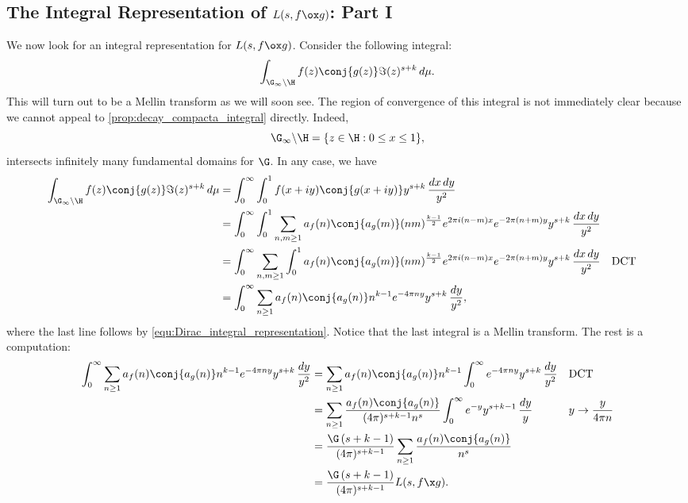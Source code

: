     \subsection*{The Integral Representation of \texorpdfstring{$L(s,f \ox g)$}{L(s,f \ox g)}: Part I}
      We now look for an integral representation for $L(s,f \ox g)$. Consider the following integral:
      \[
        \int_{\G_{\infty}\backslash\H}f(z)\conj{g(z)}\Im(z)^{s+k}\,d\mu.
      \]
      This will turn out to be a Mellin transform as we will soon see. The region of convergence of this integral is not immediately clear because we cannot appeal to \cref{prop:decay_compacta_integral} directly. Indeed,
      \[
        \G_{\infty}\backslash\H = \{z \in \H:0 \le x \le 1\},
      \]
      intersects infinitely many fundamental domains for $\G$. In any case, we have
      \begin{align*}
        \int_{\G_{\infty}\backslash\H}f(z)\conj{g(z)}\Im(z)^{s+k}\,d\mu &= \int_{0}^{\infty}\int_{0}^{1}f(x+iy)\conj{g(x+iy)}y^{s+k}\,\frac{dx\,dy}{y^{2}} \\
        &= \int_{0}^{\infty}\int_{0}^{1}\sum_{n,m \ge 1}a_{f}(n)\conj{a_{g}(m)}(nm)^{\frac{k-1}{2}}e^{2\pi i(n-m)x}e^{-2\pi(n+m)y}y^{s+k}\,\frac{dx\,dy}{y^{2}} \\
        &= \int_{0}^{\infty}\sum_{n,m \ge 1}\int_{0}^{1}a_{f}(n)\conj{a_{g}(m)}(nm)^{\frac{k-1}{2}}e^{2\pi i(n-m)x}e^{-2\pi(n+m)y}y^{s+k}\,\frac{dx\,dy}{y^{2}} && \text{DCT} \\
        &= \int_{0}^{\infty}\sum_{n \ge 1}a_{f}(n)\conj{a_{g}(n)}n^{k-1}e^{-4\pi ny}y^{s+k}\,\frac{dy}{y^{2}},
      \end{align*}
      where the last line follows by \cref{equ:Dirac_integral_representation}. Notice that the last integral is a Mellin transform. The rest is a computation:
      \begin{align*}
        \int_{0}^{\infty}\sum_{n \ge 1}a_{f}(n)\conj{a_{g}(n)}n^{k-1}e^{-4\pi ny}y^{s+k}\,\frac{dy}{y^{2}} &= \sum_{n \ge 1}a_{f}(n)\conj{a_{g}(n)}n^{k-1}\int_{0}^{\infty}e^{-4\pi ny}y^{s+k}\,\frac{dy}{y^{2}} &&\text{DCT} \\
        &= \sum_{n \ge 1}\frac{a_{f}(n)\conj{a_{g}(n)}}{(4\pi)^{s+k-1}n^{s}}\int_{0}^{\infty}e^{-y}y^{s+k-1}\,\frac{dy}{y} &&\text{$y \to \frac{y}{4\pi n}$} \\
        &= \frac{\G\left(s+k-1\right)}{(4\pi)^{s+k-1}}\sum_{n \ge 1}\frac{a_{f}(n)\conj{a_{g}(n)}}{n^{s}} \\
        &= \frac{\G\left(s+k-1\right)}{(4\pi)^{s+k-1}}L(s,f \x g).
      \end{align*}
